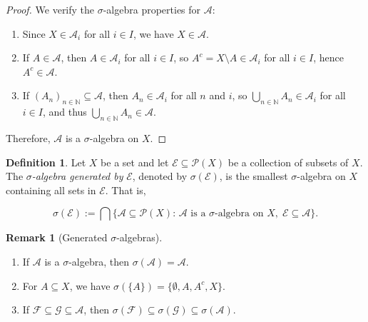 \documentclass{article}
\theoremstyle{definition}
\newtheorem{definition}{Definition}[section]
\newtheorem{remark}{Remark}[section]
\begin{document}
\begin{proof}
We verify the $\sigma$-algebra properties for $\mathcal{A}$:
\begin{enumerate}
    \item Since $X \in \mathcal{A}_i$ for all $i \in I$, we have $X \in \mathcal{A}$.
    \item If $A \in \mathcal{A}$, then $A \in \mathcal{A}_i$ for all $i \in I$, so \( A^c = X \setminus A \in \mathcal{A}_i \) for all \( i \in I \), hence \( A^c \in \mathcal{A} \).
    \item If \( (A_n)_{n \in \mathbb{N}} \subseteq \mathcal{A} \), then \( A_n \in \mathcal{A}_i \) for all \( n \) and \( i \), so \( \bigcup_{n \in \mathbb{N}} A_n \in \mathcal{A}_i \) for all \( i \in I \), and thus \( \bigcup_{n \in \mathbb{N}} A_n \in \mathcal{A} \).
\end{enumerate}
Therefore, $\mathcal{A}$ is a $\sigma$-algebra on $X$.
\end{proof}


\medskip
\begin{definition}
Let $X$ be a set and let $\mathcal{E} \subseteq \mathcal{P}(X)$ be a collection of subsets of $X$. The \textit{$\sigma$-algebra generated by} $\mathcal{E}$, denoted by $\sigma(\mathcal{E})$, is the smallest $\sigma$-algebra on $X$ containing all sets in $\mathcal{E}$. That is,

\[
\sigma(\mathcal{E}) := \bigcap \big\{ \mathcal{A} \subseteq \mathcal{P}(X) :\, \mathcal{A} \text{ is a } \sigma\text{-algebra on } X, \; \mathcal{E} \subseteq \mathcal{A} \big\}.
\]
\end{definition}


\medskip
\begin{remark}[Generated $\sigma$-algebras]
\leavevmode
\begin{enumerate}
    \item If $\mathcal{A}$ is a $\sigma$-algebra, then $\sigma(\mathcal{A}) = \mathcal{A}$.
    \item For $A \subseteq X$, we have $\sigma(\{A\}) = \{\emptyset, A, A^c, X\}$.
    \item If $\mathcal{F} \subseteq \mathcal{G} \subseteq \mathcal{A}$, then $\sigma(\mathcal{F}) \subseteq \sigma(\mathcal{G}) \subseteq \sigma(\mathcal{A})$.
\end{enumerate}
\end{remark}
\end{document}
